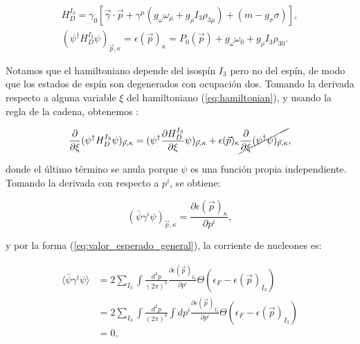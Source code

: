 \begin{equation}
	\begin{gathered}
		H_D^{I_3} = \gamma_0\left[\Vec{\gamma}\cdot\Vec{p} + \gamma^\mu(g_\omega \omega_\mu + g_\rho I_3\rho_{3\mu})+(m-g_\sigma\sigma)\right],\\
		(\psi^\dagger H_D^{I_3} \psi)_{\Vec{p},\kappa} = \epsilon(\Vec{p})_{\kappa} = P_0(\Vec{p}) + g_\omega\omega_0+g_\rho I_3\rho_{30}.
		\label{eq:hamiltonian}
	\end{gathered}
\end{equation}

Notamos que el hamiltoniano depende del isospín $I_3$ pero no del espín, de modo que los estados de espín son degenerados con ocupación dos. Tomando la derivada respecto a alguna variable $\xi$ del hamiltoniano (\ref{eq:hamiltonian}), y usando la regla de la cadena, obtenemos \cite{glendenningCompactStarsNuclear2000}:

\begin{equation}
	\begin{aligned}
		\frac{\partial}{\partial \xi} (\psi^\dagger H_D^{I_3} \psi)_{\Vec{p},\kappa} = (\psi^\dagger \frac{\partial H_D^{I_3}}{\partial \xi} \psi)_{\Vec{p},\kappa} + \epsilon(\Vec{p})_\kappa \cancel{\frac{\partial}{\partial \xi} (\psi^\dagger \psi)_{\Vec{p},\kappa}}, \\
	\end{aligned}
	\label{eq:derivada_hamiltoniano}
\end{equation}

donde el último término se anula porque $\psi$ es una función propia independiente. Tomando la derivada con respecto a $p^i$, se obtiene:

\begin{equation*}
	(\bar{\psi} \gamma^i \psi)_{\Vec{p},\kappa} = \frac{\partial \epsilon(\Vec{p})_\kappa}{\partial p^i},
\end{equation*}

y por la forma (\ref{eq:valor_esperado_general}), la corriente de nucleones es:

\begin{equation}
	\begin{aligned}
		\langle \bar{\psi} \gamma^i \psi \rangle &= 2\sum_{I_3}\int \frac{d^3p}{(2\pi)^3} \frac{\partial \epsilon(\Vec{p})_{I_3}}{\partial p^i} \Theta(\epsilon_F - \epsilon(\Vec{p})_{I_3}) \\
												 &= 2\sum_{I_3}\int \frac{d^2p}{(2\pi)^3} \int dp^i \frac{\partial \epsilon(\Vec{p})_{I_3}}{\partial p^i} \Theta(\epsilon_F - \epsilon(\Vec{p})_{I_3}) \\
												 &= 0,
		\label{eq:corriente_barionica_espacial}
	\end{aligned}		
\end{equation}

